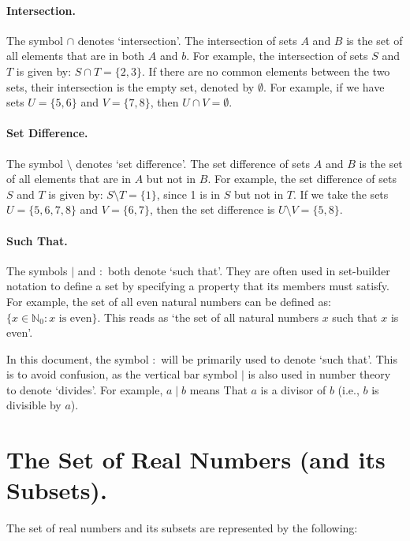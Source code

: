 \documentclass[a4paper, twoside]{article}
\newcommand{\N}{\mathbb{N}}
\begin{document}
\paragraph{Intersection.} 
The symbol \(\cap\) denotes `intersection'. The intersection of sets \(A\) and \(B\) is the set of all elements that are in both \(A\) and \(b\). For example, the intersection of sets \(S\) and \(T\) is given by: \(S \cap T = \{ 2, 3 \}\). If there are no common elements between the two sets, their intersection is the empty set, denoted by \(\emptyset\). For example, if we have sets \(U = \{ 5, 6 \}\) and \(V = \{7, 8\}\), then \(U \cap V = \emptyset\).

\paragraph{Set Difference.}
The symbol \(\setminus\) denotes `set difference'. The set difference of sets \(A\) and \(B\) is the set of all elements that are in \(A\) but not in \(B\). For example, the set difference of sets \(S\) and \(T\) is given by: \(S \setminus T = \{1\}\), since 1 is in \(S\) but not in \(T\). If we take the sets \(U = \{ 5, 6, 7, 8 \}\) and \(V = \{ 6, 7\}\), then the set difference is \(U \setminus V = \{ 5, 8 \}\).

\paragraph{Such That.}
The symbols \(\mid\) and \(:\) both denote `such that'. They are often used in set-builder notation to define a set by specifying a property that its members must satisfy. For example, the set of all even natural numbers can be defined as: \( \{ x \in \N_0 : x \text{ is even}\} \). This reads as `the set of all natural numbers \(x\) such that \(x\) is even'.

In this document, the symbol \(:\) will be primarily used to denote `such that'. This is to avoid confusion, as the vertical bar symbol \(\mid\) is also used in number theory to denote `divides'. For example, \(a \mid b\) means That \(a\) is a divisor of \(b\) (i.e., \(b\) is divisible by \(a\)).

\newpage

\section{The Set of Real Numbers (and its Subsets).}
The set of real numbers and its subsets are represented by the following:
\end{document}
